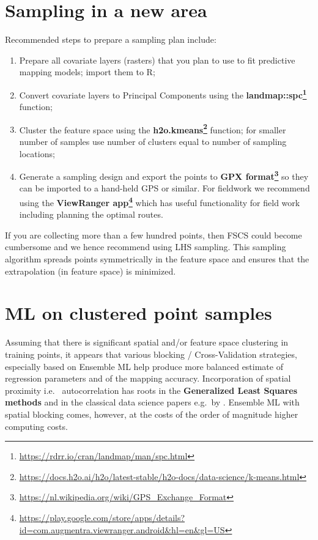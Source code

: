 \documentclass[
  graybox,natbib,nospthms]{svmono}
\providecommand{\tightlist}{%
  \setlength{\itemsep}{0pt}\setlength{\parskip}{0pt}}
\providecommand{\tightlist}{\setlength{\itemsep}{0pt}\setlength{\parskip}{0pt}}
\renewcommand{\href}[2]{#2 (\url{#1})}
\renewcommand{\href}[2]{#2\footnote{\url{#1}}}
\begin{document}
\hypertarget{sampling-in-a-new-area}{%
\section{Sampling in a new area}\label{sampling-in-a-new-area}}

Recommended steps to prepare a sampling plan include:

\begin{enumerate}
\def\labelenumi{\arabic{enumi}.}
\tightlist
\item
  Prepare all covariate layers (rasters) that you plan to use to fit
  predictive mapping models; import them to R;
\item
  Convert covariate layers to Principal Components using the
  \textbf{\href{https://rdrr.io/cran/landmap/man/spc.html}{landmap::spc}}
  function;
\item
  Cluster the feature space using the
  \textbf{\href{https://docs.h2o.ai/h2o/latest-stable/h2o-docs/data-science/k-means.html}{h2o.kmeans}}
  function; for smaller number of samples use number of clusters equal
  to number of sampling locations;
\item
  Generate a sampling design and export the points to \textbf{\href{https://nl.wikipedia.org/wiki/GPS_Exchange_Format}{GPX
  format}} so they
  can be imported to a hand-held GPS or similar. For fieldwork we
  recommend using the \textbf{\href{https://play.google.com/store/apps/details?id=com.augmentra.viewranger.android\&hl=en\&gl=US}{ViewRanger
  app}}
  which has useful functionality for field work including planning the
  optimal routes.
\end{enumerate}

If you are collecting more than a few hundred points, then FSCS could
become cumbersome and we hence recommend using LHS sampling. This
sampling algorithm spreads points symmetrically in the feature space and
ensures that the extrapolation (in feature space) is minimized.

\hypertarget{ml-on-clustered-point-samples}{%
\section{ML on clustered point samples}\label{ml-on-clustered-point-samples}}

Assuming that there is significant spatial and/or feature space clustering in
training points, it appears that various blocking / Cross-Validation strategies,
especially based on Ensemble ML help produce more balanced estimate of regression
parameters and of the mapping accuracy. Incorporation of spatial proximity i.e.~
autocorrelation has roots in the \textbf{Generalized Least Squares methods} \citep{Venables2002Springer}
and in the classical data science papers e.g.~by \citet{roberts2017cross}. Ensemble ML
with spatial blocking comes, however, at the costs of the order of magnitude
higher computing costs.
\end{document}
